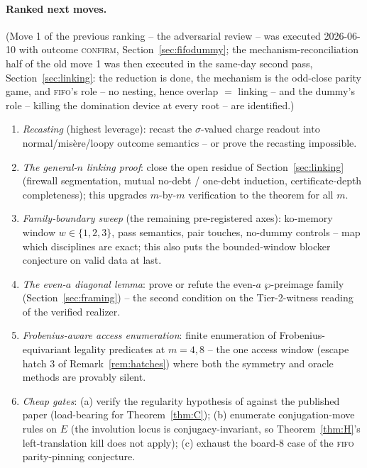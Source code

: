 \documentclass[11pt]{article}
\theoremstyle{plain}
\theoremstyle{definition}
\begin{document}
\paragraph{Ranked next moves.}
(Move 1 of the previous ranking -- the adversarial review -- was executed
2026-06-10 with outcome \textsc{confirm}, Section~\ref{sec:fifodummy};
the mechanism-reconciliation half of the old move 1 was then executed in
the same-day second pass, Section~\ref{sec:linking}: the reduction is
done, the mechanism is the odd-close parity game, and \textsc{fifo}'s
role -- no nesting, hence overlap $=$ linking -- and the dummy's role --
killing the domination device at every root -- are identified.)
\begin{enumerate}[leftmargin=*]
\item \emph{Recasting} (highest leverage): recast the $\sigma$-valued
charge readout into normal/misère/loopy outcome semantics -- or prove
the recasting impossible.
\item[1$'$.] \emph{The general-$n$ linking proof}: close the open residue
of Section~\ref{sec:linking} (firewall segmentation, mutual no-debt /
one-debt induction, certificate-depth completeness); this upgrades
$m$-by-$m$ verification to the theorem for all $m$.
\item \emph{Family-boundary sweep} (the remaining pre-registered axes):
ko-memory window $w\in\{1,2,3\}$, pass semantics, pair touches, no-dummy
controls -- map which disciplines are exact; this also puts the
bounded-window blocker conjecture on valid data at last.
\item \emph{The even-$a$ diagonal lemma}: prove or refute the even-$a$
$\wp$-preimage family (Section~\ref{sec:framing}) -- the second condition
on the Tier-2-witness reading of the verified realizer.
\item \emph{Frobenius-aware access enumeration}: finite enumeration of
Frobenius-equivariant legality predicates at $m=4,8$ -- the one access
window (escape hatch 3 of Remark~\ref{rem:hatches}) where both the symmetry
and oracle methods are provably silent.
\item \emph{Cheap gates}: (a) verify the regularity hypothesis of
\cite[Thm.~6.4]{PS} against the published paper (load-bearing for
Theorem~\ref{thm:C}); (b) enumerate conjugation-move rules on $E$ (the
involution locus is conjugacy-invariant, so Theorem~\ref{thm:H}'s
left-translation kill does not apply); (c) exhaust the board-8 case of the
\textsc{fifo} parity-pinning conjecture.
\end{enumerate}
\end{document}
